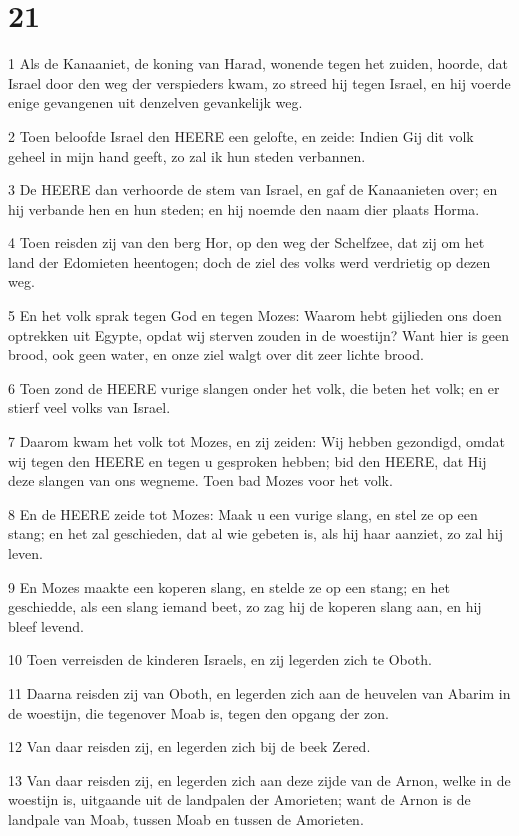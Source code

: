 \chapter{21}

\par 1 Als de Kanaaniet, de koning van Harad, wonende tegen het zuiden, hoorde, dat Israel door den weg der verspieders kwam, zo streed hij tegen Israel, en hij voerde enige gevangenen uit denzelven gevankelijk weg.
\par 2 Toen beloofde Israel den HEERE een gelofte, en zeide: Indien Gij dit volk geheel in mijn hand geeft, zo zal ik hun steden verbannen.
\par 3 De HEERE dan verhoorde de stem van Israel, en gaf de Kanaanieten over; en hij verbande hen en hun steden; en hij noemde den naam dier plaats Horma.
\par 4 Toen reisden zij van den berg Hor, op den weg der Schelfzee, dat zij om het land der Edomieten heentogen; doch de ziel des volks werd verdrietig op dezen weg.
\par 5 En het volk sprak tegen God en tegen Mozes: Waarom hebt gijlieden ons doen optrekken uit Egypte, opdat wij sterven zouden in de woestijn? Want hier is geen brood, ook geen water, en onze ziel walgt over dit zeer lichte brood.
\par 6 Toen zond de HEERE vurige slangen onder het volk, die beten het volk; en er stierf veel volks van Israel.
\par 7 Daarom kwam het volk tot Mozes, en zij zeiden: Wij hebben gezondigd, omdat wij tegen den HEERE en tegen u gesproken hebben; bid den HEERE, dat Hij deze slangen van ons wegneme. Toen bad Mozes voor het volk.
\par 8 En de HEERE zeide tot Mozes: Maak u een vurige slang, en stel ze op een stang; en het zal geschieden, dat al wie gebeten is, als hij haar aanziet, zo zal hij leven.
\par 9 En Mozes maakte een koperen slang, en stelde ze op een stang; en het geschiedde, als een slang iemand beet, zo zag hij de koperen slang aan, en hij bleef levend.
\par 10 Toen verreisden de kinderen Israels, en zij legerden zich te Oboth.
\par 11 Daarna reisden zij van Oboth, en legerden zich aan de heuvelen van Abarim in de woestijn, die tegenover Moab is, tegen den opgang der zon.
\par 12 Van daar reisden zij, en legerden zich bij de beek Zered.
\par 13 Van daar reisden zij, en legerden zich aan deze zijde van de Arnon, welke in de woestijn is, uitgaande uit de landpalen der Amorieten; want de Arnon is de landpale van Moab, tussen Moab en tussen de Amorieten.
